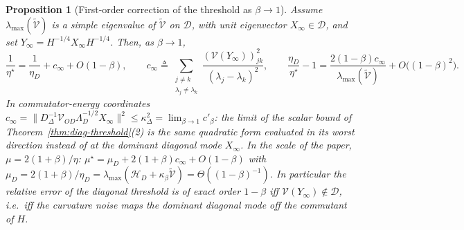 \documentclass[11pt]{article}
\newtheorem{proposition}[theorem]{Proposition}
\theoremstyle{remark}
\begin{document}
\begin{proposition}[First-order correction of the threshold as $\beta\to1$]\label{prop:diag-expansion}
Assume $\lambda_{\max}(\widetilde{\mathcal V})$ is a simple eigenvalue of $\widetilde{\mathcal V}$ on $\mathcal D$, with unit eigenvector $X_\infty\in\mathcal D$, and set $Y_\infty=H^{-1/4}X_\infty H^{-1/4}$. Then, as $\beta\to1$,
\[
\frac1{\eta^\star}=\frac1{\eta_D}+c_\infty+O(1-\beta),\qquad c_\infty\triangleq\sum_{\substack{j\ne k\\\lambda_j\ne\lambda_k}}\frac{(\mathcal V(Y_\infty))_{jk}^2}{(\lambda_j-\lambda_k)^2},
\qquad
\frac{\eta_D}{\eta^\star}-1=\frac{2(1-\beta)c_\infty}{\lambda_{\max}(\widetilde{\mathcal V})}+O\big((1-\beta)^2\big).
\]
In commutator-energy coordinates $c_\infty=\big\|D_\Delta^{-1}\mathcal V_{OD}\Lambda_D^{-1/2}X_\infty\big\|^2\le\kappa_\Delta^2=\lim_{\beta\to1}c'_\beta$: the limit of the scalar bound of Theorem~\ref{thm:diag-threshold}(2) is the same quadratic form evaluated in its worst direction instead of at the dominant diagonal mode $X_\infty$. In the scale of the paper, $\mu=2(1+\beta)/\eta$: $\mu^\star=\mu_D+2(1+\beta)c_\infty+O(1-\beta)$ with $\mu_D=2(1+\beta)/\eta_D=\lambda_{\max}(\mathcal H_D+\kappa_\beta\widetilde{\mathcal V})=\Theta((1-\beta)^{-1})$.
In particular the relative error of the diagonal threshold is of exact order $1-\beta$ iff $\mathcal V(Y_\infty)\notin\mathcal D$, i.e.\ iff the curvature noise maps the dominant diagonal mode off the commutant of $H$.
\end{proposition}
\end{document}
